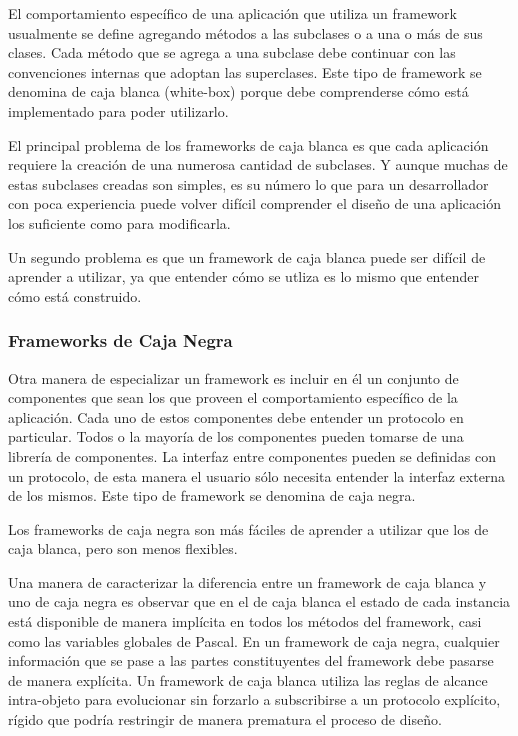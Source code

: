 	El comportamiento específico de una aplicación que utiliza un framework usualmente se define agregando métodos a las subclases o a una o más de sus clases. Cada método que se agrega a una subclase debe continuar con las convenciones internas que adoptan las superclases. Este tipo de framework se denomina de caja blanca (white-box) porque debe comprenderse cómo está implementado para poder utilizarlo.
	
	El principal problema de los frameworks de caja blanca es que cada aplicación requiere la creación de una numerosa cantidad  de subclases. Y aunque muchas de estas subclases creadas son simples, es su número lo que para un desarrollador con poca experiencia puede volver difícil comprender el diseño de una aplicación los suficiente como para modificarla.
	
	Un segundo problema es que un framework de caja blanca puede ser difícil de aprender a utilizar, ya que entender cómo se utliza es lo mismo que entender cómo está construido.
	
\subsubsection{Frameworks de Caja Negra}

	Otra manera de especializar un framework es incluir en él un conjunto de componentes que sean los que proveen el comportamiento específico de la aplicación. Cada uno de estos componentes debe entender un protocolo en particular. Todos o la mayoría de los componentes pueden tomarse de una librería de componentes. La interfaz entre componentes pueden se definidas con un protocolo, de esta manera el usuario sólo necesita entender la interfaz externa de los mismos. Este tipo de framework se denomina de caja negra.
	
	Los frameworks de caja negra son más fáciles de aprender a utilizar que los de caja blanca, pero son menos flexibles. 
	
	Una manera de caracterizar la diferencia entre un framework de caja blanca y uno de caja negra es observar que en el de caja blanca el estado de cada instancia está disponible de manera implícita en todos los métodos del framework, casi como las variables globales de Pascal. En un framework de caja negra, cualquier información que se pase a las partes constituyentes del framework debe pasarse de manera explícita. Un framework de caja blanca utiliza las reglas de alcance intra-objeto para evolucionar sin forzarlo a subscribirse a un protocolo explícito, rígido que podría restringir de manera prematura el proceso de diseño.
	

